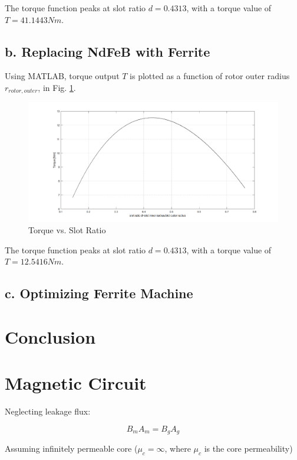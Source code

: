 \documentclass[a4paper, 11pt, titlepage]{article}
\begin{document}
The torque function peaks at slot ratio $d=0.4313$, with a torque value of $T=41.1443Nm$.


\subsection{b. Replacing NdFeB with Ferrite}


Using MATLAB, torque output $T$ is plotted as a function of rotor outer radius $r_{rotor,outer}$, in Fig. \ref{fig:TvsD_Ferrite}.
\begin{figure}[h]
	\includegraphics[width=\textwidth]{torquevsD_Ferrite.png}
	\caption{Torque vs. Slot Ratio}
	\label{fig:TvsD_Ferrite}
\end{figure}

The torque function peaks at slot ratio $d=0.4313$, with a torque value of $T=12.5416Nm$.

\subsection{c. Optimizing Ferrite Machine}

\section{Conclusion}

\appendix


\section{Magnetic Circuit}
\label{app:magneticCircuit}

Neglecting leakage flux:

\begin{equation}
	B_mA_m = B_gA_g
\end{equation}

Assuming infinitely permeable core ($\mu_c=\infty$, where $\mu_c$ is the core permeability)
\end{document}
